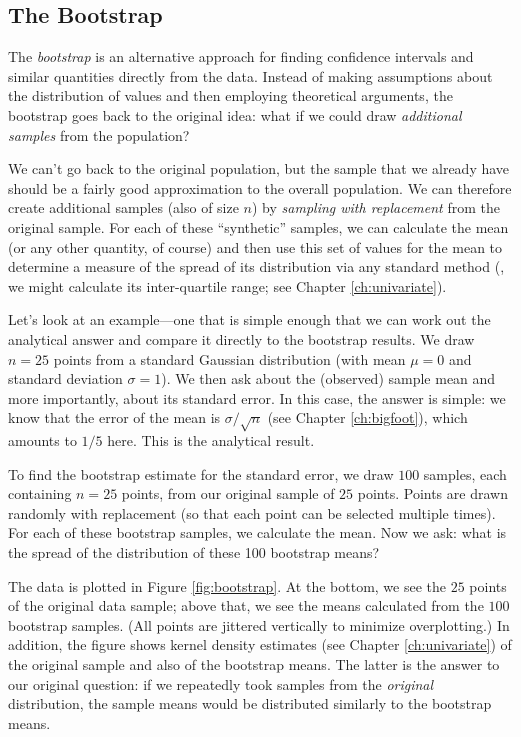\subsection{The Bootstrap}


The \emph{bootstrap} is an alternative approach for finding confidence
intervals and similar quantities directly from the data. Instead of
making assumptions about the distribution of values and then employing
theoretical arguments, the bootstrap goes back to the original idea:
what if we could draw \emph{additional samples} from the population?

We can't go back to the original population, but the sample that we
already have should be a fairly good approximation to the overall
population. We can therefore create additional samples (also of size
$n$) by \emph{sampling with replacement} from the original sample.
For each of these ``synthetic'' samples, we can calculate the mean (or
any other quantity, of course) and then use this set of values for the
mean to determine a measure of the spread of its distribution via any
standard method (\eg, we might calculate its inter-quartile range; see
Chapter \ref{ch:univariate}).

Let's look at an example---one that is simple enough that we can work
out the analytical answer and compare it directly to the bootstrap
results. We draw $n = 25$ points from a standard Gaussian distribution
(with mean $\mu = 0$ and standard deviation $\sigma = 1$). We then ask
about the (observed) sample mean and more importantly, about its
standard error. In this case, the answer is simple: we know that the
error of the mean is $\sigma/\sqrt{n}$ (see Chapter \ref{ch:bigfoot}),
which amounts to $1/5$ here. This is the analytical result.

To find the bootstrap estimate for the standard error,  we draw $100$
samples, each containing $n = 25$ points, from our original sample of
$25$ points. Points are drawn randomly with replacement (so that each
point can be selected multiple times). For each of these bootstrap
samples, we calculate the mean. Now we ask: what is the spread of the
distribution of these 100 bootstrap means?

The data is plotted in Figure \ref{fig:bootstrap}. At the bottom, we
see the $25$ points of the original data sample; above that, we see
the means calculated from the $100$ bootstrap samples. (All points are
jittered vertically to minimize overplotting.) In addition, the figure
shows 
kernel density estimates (see Chapter \ref{ch:univariate}) of the
original sample and also of the bootstrap means. The latter is the
answer to our original question: if we repeatedly took samples from
the \emph{original} distribution, the sample means would be distributed
similarly to the bootstrap means.

